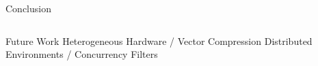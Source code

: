 \begin{frame}{Conclusion}
\begin{columns}
\centering
\begin{outline} 
  \1 Future Work
  \2 Heterogeneous Hardware / Vector Compression
  \2 Distributed Environments / Concurrency
  \2 Filters
\end{outline}

\begin{center}
\centering


\end{center}
\end{columns}
\end{frame}
